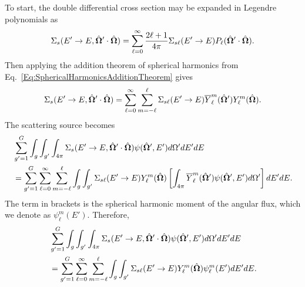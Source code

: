 To start, the double differential cross section may be expanded in Legendre polynomials as
\begin{align}
  \Sigma_s(E' \rightarrow E, \hat{\mathbf{\Omega}}' \cdot \hat{\mathbf{\Omega}}) = \sum_{\ell=0}^\infty \frac{2\ell + 1}{4\pi} \Sigma_{s\ell}(E' \rightarrow E) P_\ell(\hat{\mathbf{\Omega}}' \cdot \hat{\mathbf{\Omega}}) .
\end{align}
Then applying the addition theorem of spherical harmonics from Eq.~\eqref{Eq:SphericalHarmonicsAdditionTheorem} gives
\begin{align}
  \Sigma_s(E' \rightarrow E, \hat{\mathbf{\Omega}}' \cdot \hat{\mathbf{\Omega}}) = \sum_{\ell=0}^\infty \sum_{m=-\ell}^\ell \Sigma_{s\ell}(E' \rightarrow E) \overline{Y}_\ell^m(\hat{\mathbf{\Omega}}')  Y_\ell^m(\hat{\mathbf{\Omega}}) .
\end{align}
The scattering source becomes
\begin{align}
   &\sum_{g'=1}^G \int_g \int_{g'} \int_{4\pi} \Sigma_s(E' \rightarrow E, \hat{\mathbf{\Omega}}' \cdot \hat{\mathbf{\Omega}}) \psi(\hat{\mathbf{\Omega}}',E') d\Omega' dE' dE \nonumber \\
   &= \sum_{g'=1}^G \sum_{\ell=0}^\infty \sum_{m=-\ell}^\ell \int_g \int_{g'} \Sigma_{s\ell}(E' \rightarrow E)  Y_\ell^m(\hat{\mathbf{\Omega}})  \left[ \int_{4\pi} \overline{Y}_\ell^m(\hat{\mathbf{\Omega}}') \psi(\hat{\mathbf{\Omega}}',E') d\Omega' \right] dE' dE .
\end{align}
The term in brackets is the spherical harmonic moment of the angular flux, which we denote as $\psi_\ell^m(E')$. Therefore,
\begin{align}
   &\sum_{g'=1}^G \int_g \int_{g'} \int_{4\pi} \Sigma_s(E' \rightarrow E, \hat{\mathbf{\Omega}}' \cdot \hat{\mathbf{\Omega}}) \psi(\hat{\mathbf{\Omega}}',E') d\Omega' dE' dE \nonumber \\
   &= \sum_{g'=1}^G \sum_{\ell=0}^\infty \sum_{m=-\ell}^\ell \int_g \int_{g'} \Sigma_{s\ell}(E' \rightarrow E)  Y_\ell^m(\hat{\mathbf{\Omega}})  \psi_\ell^m(E') dE' dE .
\end{align}

